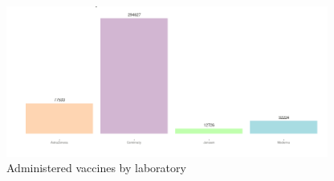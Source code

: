 \begin{figure}[H]
\centering
\includegraphics[width=300pt,trim=10 0 0 -10mm]{images/grafico4novo.png}
\caption{Administered vaccines by laboratory}
\label{fig:diagrama3}
\end{figure}